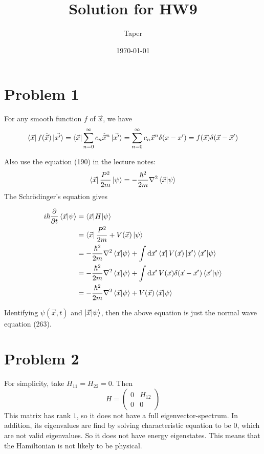 \documentclass{article}
\title{Solution for HW9}
\date{\today}
\author{Taper}
\begin{document}
\maketitle
{}
\section*{Problem 1}
For any smooth function $f$ of $\vec{x}$, we have
$$\bra{\vec{x}}f(\hat{\vec{x}})\ket{\vec{x'}}
= \bra{\vec{x}} \sum_{n=0}^\infty c_n \hat{\vec{x}}^n \ket{\vec{x'}}
= \sum_{n=0}^\infty c_n \vec{x}^n \delta(x-x')
= f(\vec{x})\delta(\vec{x}-\vec{x}')$$

Also use the equation (190) in the lecture notes:
\begin{equation}
    \bra{\vec{x}}\frac{P^2}{2m}\ket{\psi}
    =-\frac{\hbar^2}{2m} \laplacian \braket{\vec{x}|\psi}
\end{equation}
The Schr\"odinger's equation gives

\begin{align*}
    i\hbar\frac{\partial }{\partial t}\braket{\vec{x}|\psi}
    &= \braket{\vec{x}|H|\psi} \\
    &= \bra{\vec{x}} \frac{P^2}{2m}+V(\vec{x}) \ket{\psi} \\
    &= -\frac{\hbar^2}{2m} \laplacian \braket{\vec{x}|\psi} +
    \int\dd{\vec{x}'}\bra{\vec{x}}V(\vec{x})\ket{\vec{x}'}
        \braket{\vec{x}'|\psi} \\
    &= -\frac{\hbar^2}{2m} \laplacian \braket{\vec{x}|\psi} +
        \int\dd{\vec{x}'}V(\vec{x})\delta(\vec{x}-\vec{x}')
        \braket{\vec{x}'|\psi} \\
    &= -\frac{\hbar^2}{2m} \laplacian \braket{\vec{x}|\psi} +
        V(\vec{x}) \braket{\vec{x}|\psi}
\end{align*}

Identifying $\psi(\vec{x},t)$ and $\ket{\vec{x}|\psi}$, then the above
equation is just the normal wave equation (263).

\section*{Problem 2}
For simplicity, take $H_{11}=H_{22}=0$. Then
\begin{equation}
    H= \begin{pmatrix}
        0 & H_{12} \\ 0 & 0
    \end{pmatrix}
\end{equation}
This matrix has rank $1$, so it does not have a full
eigenvector-spectrum.
In addition, its eigenvalues are find by solving characteristic
equation to be $0$, which are not valid eigenvalues. So it does not
have energy eigenstates. This means that the Hamiltonian is not
likely to be physical.
\end{document}
